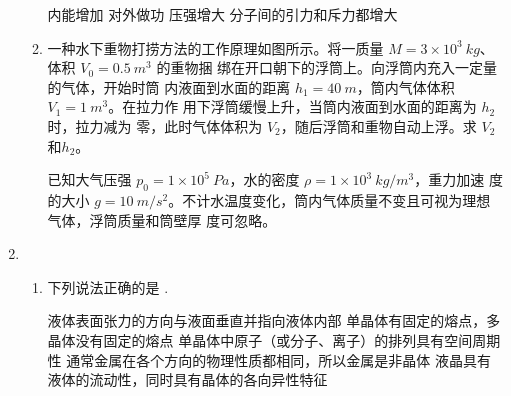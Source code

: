 \begin{enumerate}
\begin{enumerate}
\fourchoices
{内能增加}
{对外做功}
{压强增大}
{分子间的引力和斥力都增大}



\item 
一种水下重物打捞方法的工作原理如图所示。将一质量 $ M=3 \times 10^{3} \ kg $、体积 $ V_{0}=0.5 \ m^{3} $ 的重物捆
绑在开口朝下的浮筒上。向浮筒内充入一定量的气体，开始时筒
内液面到水面的距离 $ h_{1} =40 \ m $，筒内气体体积 $ V_{1} =1 \ m^{3} $。在拉力作
用下浮筒缓慢上升，当筒内液面到水面的距离为 $ h_{2} $ 时，拉力减为
零，此时气体体积为 $ V_{2} $，随后浮筒和重物自动上浮。求 $ V_{2} $ 和$ h_{2} $。




已知大气压强 $ p_{0} =1 \times 10^{5} \ Pa $，水的密度 $ \rho=1 \times 10^{3} \ kg/m^{3} $，重力加速
度的大小 $ g=10 \ m/s^{2} $。不计水温度变化，筒内气体质量不变且可视为理想气体，浮筒质量和筒壁厚
度可忽略。
\begin{figure}[h!]
	\flushright
	
\end{figure}

	

	
\end{enumerate}


\item 
{}
\begin{enumerate}
	\item
下列说法正确的是 \underlinegap .

\fivechoices
{液体表面张力的方向与液面垂直并指向液体内部}
{单晶体有固定的熔点，多晶体没有固定的熔点}
{单晶体中原子（或分子、离子）的排列具有空间周期性}
{通常金属在各个方向的物理性质都相同，所以金属是非晶体}
{液晶具有液体的流动性，同时具有晶体的各向异性特征}



\end{enumerate}
\end{enumerate}
